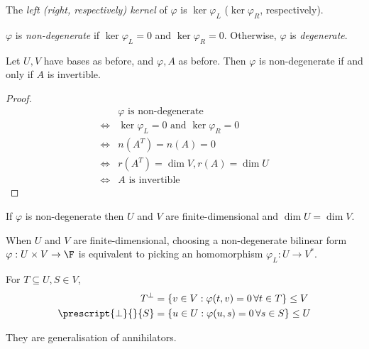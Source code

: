 \documentclass[a4paper]{article}
\theoremstyle{definition}
\begin{document}
\begin{definition}
  The \emph{left (right, respectively) kernel} of \(\varphi\) is \(\ker \varphi_L\) (\(\ker \varphi_R\), respectively).
\end{definition}

\begin{definition}[Degeneracy]
  \(\varphi\) is \emph{non-degenerate} if \(\ker \varphi_L = 0\) and \(\ker \varphi_R = 0\). Otherwise, \(\varphi\) is \emph{degenerate}.
\end{definition}

\begin{lemma}
  Let \(U, V\) have bases as before, and \(\varphi, A\) as before. Then \(\varphi\) is non-degenerate if and only if \(A\) is invertible.
\end{lemma}

\begin{proof}
  \begin{align*}
    & \varphi \text{ is non-degenerate} \\
    \Leftrightarrow & \ker \varphi_L = 0 \text{ and } \ker \varphi_R = 0 \\
    \Leftrightarrow & n(A^T) = n(A) = 0 \\
    \Leftrightarrow & r(A^T) = \dim V, r(A) = \dim U \\
    \Leftrightarrow & A \text{ is invertible}
  \end{align*}
\end{proof}

\begin{corollary}
  If \(\varphi\) is non-degenerate then \(U\) and \(V\) are finite-dimensional and \(\dim U = \dim V\).
\end{corollary}

\begin{corollary}
  When \(U\) and \(V\) are finite-dimensional, choosing a non-degenerate bilinear form \(\varphi: U \times V \to \F\) is equivalent to picking an homomorphism \(\varphi_L: U \to V^*\).
\end{corollary}

\begin{definition}
  For \(T \subseteq U, S \in V\),
  \begin{align*}
    T^\perp &= \{ v\in V: \varphi(t, v) = 0 \, \forall t\in T \} \leq V \\
    \prescript{\perp}{}{S} &= \{ u\in U: \varphi(u, s) = 0 \, \forall s\in S \} \leq U
  \end{align*}
\end{definition}
They are generalisation of annihilators.
\end{document}
